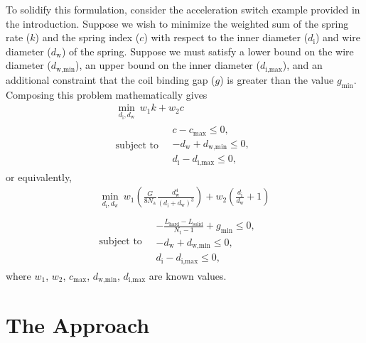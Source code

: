\documentclass[10pt]{article}
\begin{document}
To solidify this formulation, consider the acceleration switch example provided in the introduction. Suppose we wish to minimize the weighted sum of the spring rate ($k$) and the spring index ($c$) with respect to the inner diameter ($d_{\text{i}}$) and wire diameter ($d_{\text{w}}$) of the spring. Suppose we must satisfy a lower bound on the wire diameter ($d_{\text{w,min}}$), an upper bound on the inner diameter ($d_{\text{i,max}}$), and an additional constraint that the coil binding gap ($g$) is greater than the value $g_{\text{min}}$. Composing this problem mathematically gives
				\begin{equation}
 					\begin{gathered}
 						\min_{d_{\text{i}}, d_{\text{w}}} \ w_{1}k + w_{2}c \\
 						\mbox{subject to} \quad
						 \begin{split} 
						 	c - c_{\text{max}}\le 0, \\
						 	-d_{\text{w}} + d_{\text{w,min}}\le 0, \\
							d_{\text{i}} - d_{\text{i,max}} \le 0,
						\end{split}
					\end{gathered}
				\end{equation}
or equivalently,
 					\begin{equation}
 					\begin{gathered}
 						\min_{d_{\text{i}}, d_{\text{w}}} \ w_{1}\left(\frac{G}{8N_{\text{a}}}\frac{d_{\text{w}}^{4}}{(d_{\text{i}} + d_{\text{w}})^{3}}\right) + w_{2}\left(\frac{d_{\text{i}}}{d_{\text{w}}} + 1\right) \\ \\
 						\mbox{subject to} \quad
						 \begin{split} 
						 	-\frac{L_{\text{hard}} - L_{\text{solid}}}{N_{\text{t}} - 1} + g_{\text{min}}\le 0, \\
						 	-d_{\text{w}} + d_{\text{w,min}}\le 0, \\
							d_{\text{i}} - d_{\text{i,max}} \le 0,
						\end{split}
					\end{gathered}
					\label{eq:Problem}
				\end{equation}				
where $w_{1}$, $w_{2}$, $c_{\text{max}}$, $d_{\text{w,min}}$, $d_{\text{i,max}}$ are known values.

\section{The Approach}
\label{sec:The_Approach}
\end{document}
